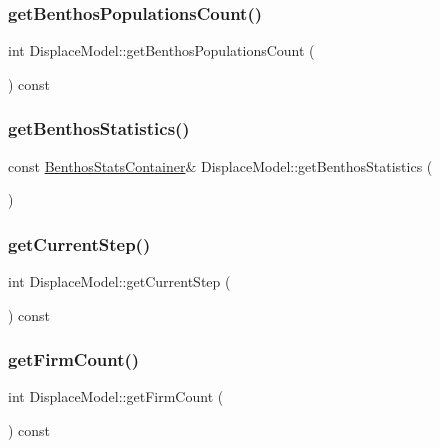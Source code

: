 \subsubsection{\texorpdfstring{getBenthosPopulationsCount()}{getBenthosPopulationsCount()}}
{\footnotesize\ttfamily int Displace\+Model\+::get\+Benthos\+Populations\+Count (\begin{DoxyParamCaption}{ }\end{DoxyParamCaption}) const}

\mbox{\label{class_displace_model_aa9e8575daf8a3e730932257ea06be271}} 
\subsubsection{\texorpdfstring{getBenthosStatistics()}{getBenthosStatistics()}}
{\footnotesize\ttfamily const \mbox{\hyperlink{class_displace_model_a58dc0cf9a12cf5a26c28dfdddd3f36ba}{Benthos\+Stats\+Container}}\& Displace\+Model\+::get\+Benthos\+Statistics (\begin{DoxyParamCaption}{ }\end{DoxyParamCaption})\hspace{0.3cm}{\ttfamily [inline]}}

\mbox{\label{class_displace_model_a5eac67eac3f050ca5f3645f5ead8a299}} 
\subsubsection{\texorpdfstring{getCurrentStep()}{getCurrentStep()}}
{\footnotesize\ttfamily int Displace\+Model\+::get\+Current\+Step (\begin{DoxyParamCaption}{ }\end{DoxyParamCaption}) const\hspace{0.3cm}{\ttfamily [inline]}}

\mbox{\label{class_displace_model_af08856d5233fb20382e9efc821d33813}} 
\subsubsection{\texorpdfstring{getFirmCount()}{getFirmCount()}}
{\footnotesize\ttfamily int Displace\+Model\+::get\+Firm\+Count (\begin{DoxyParamCaption}{ }\end{DoxyParamCaption}) const}

